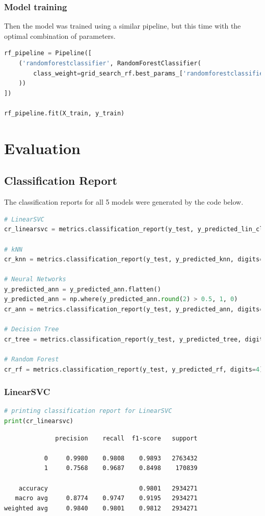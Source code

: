 \documentclass{article}
\begin{document}
\subsubsection{Model training}
Then the model was trained using a similar pipeline, but this time with the optimal combination of parameters.

\begin{lstlisting}[language=Python]
rf_pipeline = Pipeline([
    ('randomforestclassifier', RandomForestClassifier(
        class_weight=grid_search_rf.best_params_['randomforestclassifier__class_weight']
    ))
])

rf_pipeline.fit(X_train, y_train)
\end{lstlisting}

\section{Evaluation}

\subsection{Classification Report}

The classification reports for all 5 models were generated by the code below.

\begin{lstlisting}[language=Python]
# LinearSVC
cr_linearsvc = metrics.classification_report(y_test, y_predicted_lin_clf, digits=4)

# kNN
cr_knn = metrics.classification_report(y_test, y_predicted_knn, digits=4)

# Neural Networks
y_predicted_ann = y_predicted_ann.flatten()
y_predicted_ann = np.where(y_predicted_ann.round(2) > 0.5, 1, 0)
cr_ann = metrics.classification_report(y_test, y_predicted_ann, digits=4)

# Decision Tree
cr_tree = metrics.classification_report(y_test, y_predicted_tree, digits=4)

# Random Forest
cr_rf = metrics.classification_report(y_test, y_predicted_rf, digits=4)
\end{lstlisting}

\subsubsection{LinearSVC}
\begin{lstlisting}[language=Python]
# printing classification report for LinearSVC
print(cr_linearsvc)
\end{lstlisting}
\begin{verbatim}  
              precision    recall  f1-score   support

           0     0.9980    0.9808    0.9893   2763432
           1     0.7568    0.9687    0.8498    170839

    accuracy                         0.9801   2934271
   macro avg     0.8774    0.9747    0.9195   2934271
weighted avg     0.9840    0.9801    0.9812   2934271
\end{verbatim}
\end{document}
